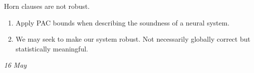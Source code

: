 

Horn clauses are not robust.


\begin{enumerate}
  \item Apply PAC bounds when describing the soundness of a neural system.
  \item We may seek to make our system robust. Not necessarily globally correct but statistically meaningful.
\end{enumerate}

\bigskip
\textit{16 May}
